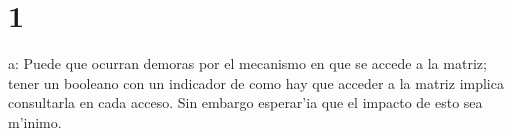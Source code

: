 \documentclass[11pt,a4]{article}
\begin{document}
\section{1}
a: Puede que ocurran demoras por el mecanismo en que se accede a la matriz; tener un booleano con un indicador de como hay que acceder a la matriz implica consultarla en cada acceso. Sin embargo esperar'ia que el impacto de esto sea m'inimo.
\end{document}

